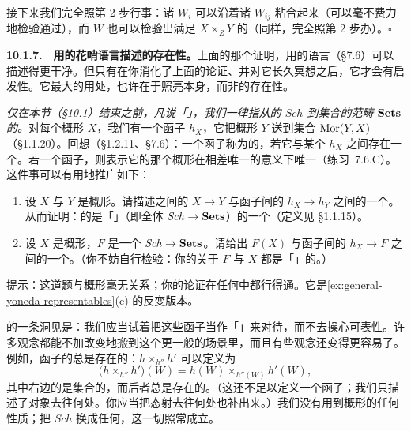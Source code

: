 接下来我们完全照第 2 步行事：诸 $W_i$ 可以沿着诸 $W_{ij}$ 粘合起来（\trCocycleCondition{}可以毫不费力地检验通过），而 $W$ 也可以检验出满足 $X\times_Z Y$ 的\trUniversalProperty（同样，完全照第 2 步办）。\hfill$\square$

\textbf{10.1.7.}\ \extrahard\ \textbf{用\trRepresentableFunctor{}的花哨语言描述\trFiberProduct{}的存在性。}\quad 上面的那个证明，用\trRepresentableFunctor{}的语言（\S7.6）可以描述得更干净。但只有在你消化了上面的论证、并对它长久冥想之后，它才会有启发性。它最大的用处，也许在于照亮\trRepresentableFunctor{}本身，而非\trFiberProduct{}的存在性。

\emph{仅在本节（\S10.1）结束之前，凡说「\trFunctor」，我们一律指从\trScheme{}的\trCategory{} $\mathit{Sch}$ 到集合的范畴 $\mathbf{Sets}$ 的\trContravariantFunctor。}对每个概形 $X$，我们有一个函子 $h_X$，它把概形 $Y$ 送到集合 $\operatorname{Mor}(Y,X)$（\S1.1.20）。回想（\S1.2.11、\S7.6）：一个函子称为\emph{\trRepresentable}的，若它与某个 $h_X$ 之间存在一个\trNaturalIsomorphism。若一个函子\trRepresentable，则表示它的那个概形在相差唯一\trIsomorphism{}的意义下唯一（\mbox{练习~7.6.C}）。这件事可以有用地推广如下：

\begin{exercise}[\trYonedaLemma]\label{ex:yoneda-lemma-schemes}
\begin{enumerate}[label=(\alph*)]
  \item 设 $X$ 与 $Y$ 是概形。请描述\trScheme{}之间的\trMorphism{} $X\to Y$ 与函子间的\trNaturalTransformation{} $h_X\to h_Y$ 之间的一个\trBijection。从而证明：\trScheme{}的\trCategory{}是「\trFunctorCategory」（即全体\trContravariantFunctor{} $\mathit{Sch}\to\mathbf{Sets}$）的一个\trFullSubcategory（定义见 \S1.1.15）。
  \item 设 $X$ 是概形，$F$ 是一个\trContravariantFunctor{} $\mathit{Sch}\to\mathbf{Sets}$。请给出 $F(X)$ 与函子间的\trNaturalTransformation{} $h_X\to F$ 之间的一个\trBijection。（你不妨自行检验：你的\trBijection{}关于 $F$ 与 $X$ 都是「\trFunctoriality」的。）
\end{enumerate}
提示：这道题与概形毫无关系；你的论证在任何\trCategory{}中都行得通。它是\cref{ex:general-yoneda-representables}(c) 的反变版本。
\end{exercise}

\trGrothendieck{}的一条洞见是：我们应当试着把这些函子当作「\trGeometricSpace」来对待，而不去操心可表性。许多观念都能不加改变地搬到这个更一般的场景里，而且有些观念还变得更容易了。例如，函子的\trFiberProduct{}总是存在的：$h\times_{h''}h'$ 可以定义为
\[
\bigl(h\times_{h''}h'\bigr)(W)=h(W)\times_{h''(W)}h'(W),
\]
其中右边的\trFiberProduct{}是集合的\trFiberProduct，而后者总是存在的。（这还不足以定义一个函子；我们只描述了对象去往何处。你应当把态射去往何处也补出来。）我们没有用到概形的任何性质；把 $\mathit{Sch}$ 换成任何\trCategory，这一切照常成立。

